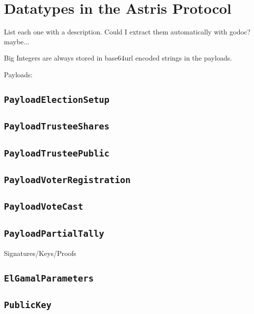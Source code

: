 \chapter{Datatypes in the Astris Protocol}
\label{appendix:datatypes}

List each one with a description. Could I extract them automatically with godoc? maybe...

Big Integers are always stored in base64url encoded strings in the payloads.


Payloads:
\section*{\texttt{PayloadElectionSetup}}
\label{dt:payload:setup}


\section*{\texttt{PayloadTrusteeShares}}
\label{dt:payload:shares}

\section*{\texttt{PayloadTrusteePublic}}
\label{dt:payload:public}

\section*{\texttt{PayloadVoterRegistration}}
\label{dt:payload:reg}

\section*{\texttt{PayloadVoteCast}}
\label{dt:payload:cast}

\section*{\texttt{PayloadPartialTally}}
\label{dt:payload:tally}



Signatures/Keys/Proofs

\section*{\texttt{ElGamalParameters}}
\label{dt:elgamal:params}


\section*{\texttt{PublicKey}}
\label{dt:elgamal:pk}

